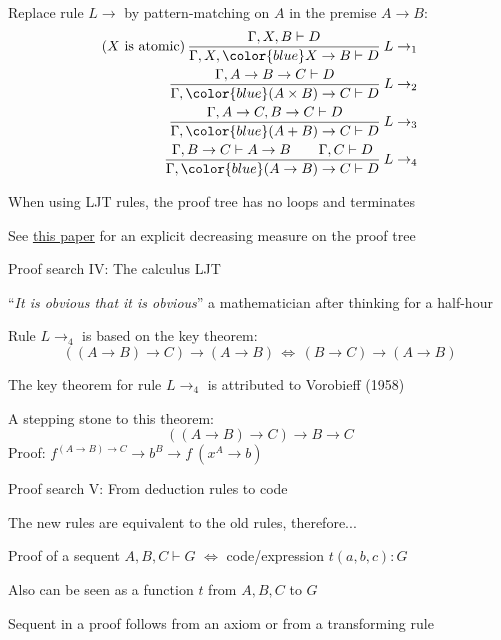 Replace rule $L\rightarrow$ by pattern-matching on $A$ in the premise
$A\rightarrow B$:
\begin{align*}
\text{(}X\text{ is atomic)\,}\frac{\Gamma,X,B\vdash D}{\Gamma,X,{\color{blue}X\rightarrow B}\vdash D}\:L\rightarrow_{1}\\
\frac{\Gamma,A\rightarrow B\rightarrow C\vdash D}{\Gamma,{\color{blue}(A\times B)\rightarrow C}\vdash D}\:L\rightarrow_{2}\\
\frac{\Gamma,A\rightarrow C,B\rightarrow C\vdash D}{\Gamma,{\color{blue}(A+B)\rightarrow C}\vdash D}\:L\rightarrow_{3}\\
\frac{\Gamma,B\rightarrow C\vdash A\rightarrow B\quad\quad\Gamma,C\vdash D}{\Gamma,{\color{blue}(A\rightarrow B)\rightarrow C}\vdash D}\:L\rightarrow_{4}
\end{align*}

When using LJT rules, the proof tree has no loops and terminates

See \href{http://citeseer.ist.psu.edu/viewdoc/summary?doi=10.1.1.35.2618}{this paper}
for an explicit decreasing measure on the proof tree

Proof search IV: The calculus LJT

\textsf{``}\emph{It is obvious that it is obvious}\textsf{''} \textemdash{} a mathematician
after thinking for a half-hour

Rule $L\rightarrow_{4}$ is based on the key theorem: {\footnotesize{}
\[
\left(\left(A\rightarrow B\right)\rightarrow C\right)\rightarrow\left(A\rightarrow B\right)\,\Longleftrightarrow\,\left(B\rightarrow C\right)\rightarrow\left(A\rightarrow B\right)
\]
}{\footnotesize\par}

The key theorem for rule $L\rightarrow_{4}$ is attributed to Vorobieff
(1958)

A stepping stone to this theorem:{\footnotesize{}
\[
\left(\left(A\rightarrow B\right)\rightarrow C\right)\rightarrow B\rightarrow C
\]
}Proof: $f^{\left(A\rightarrow B\right)\rightarrow C}\rightarrow b^{B}\rightarrow f\:(x^{A}\rightarrow b)$

Proof search V: From deduction rules to code

The new rules are equivalent to the old rules, therefore...

Proof of a sequent $A,B,C\vdash G$ $\Leftrightarrow$ code/expression
$t(a,b,c):G$

Also can be seen as a function $t$ from $A,B,C$ to $G$

Sequent in a proof follows from an axiom or from a transforming rule

